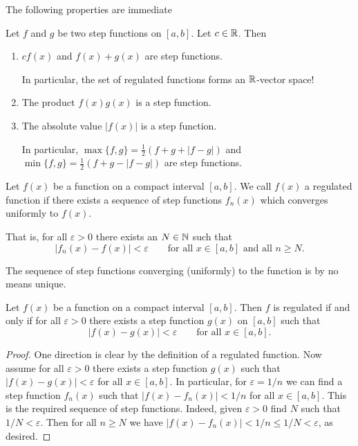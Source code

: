 \documentclass[10pt, a4paper]{article}
\begin{document}
The following properties are immediate
\begin{proposition}
    Let $f$ and $g$ be two step functions on $[a, b]$.
    Let $c \in \mathbb{R}$.
    Then
    \begin{enumerate}[label = (\roman*)]
        \item $cf(x)$ and $f(x) + g(x)$ are step functions.
        
        In particular,
        the set of regulated functions forms an $\mathbb{R}$-vector space!

        \item The product $f(x)g(x)$ is a step function.

        \item The absolute value $|f(x)|$ is a step function.

        In particular,
        $\max\{f, g\} = \frac{1}{2}(f + g + |f - g|)$ and $\min\{f, g\} = \frac{1}{2}(f + g - |f - g|)$ are step functions.
    \end{enumerate}
\end{proposition}

\begin{definition}
    Let $f(x)$ be a function on a compact interval $[a, b]$.
    We call $f(x)$ a regulated function if there exists a sequence of step functions $f_n(x)$ which converges uniformly to $f(x)$.

    That is,
    for all $\varepsilon > 0$ there exists an $N \in \mathbb{N}$ such that
    \[
    |f_n(x) - f(x)| < \varepsilon\qquad\text{for all } x \in [a, b]\text{ and all } n \geq N.
    \]
\end{definition}

\begin{remark}
    The sequence of step functions converging
    (uniformly)
    to the function is by no means unique.
\end{remark}

\begin{lemma}\label{pre:analy:lem:seqfreecritforbereg}
    Let $f(x)$ be a function on a compact interval $[a, b]$.
    Then $f$ is regulated if and only if for all $\varepsilon > 0$ there exists a step function $g(x)$ on $[a, b]$ such that
    \[
    |f(x) - g(x)| < \varepsilon\qquad\text{for all } x \in [a, b].
    \]
    \begin{proof}
        One direction is clear by the definition of a regulated function.
        Now assume for all $\varepsilon > 0$ there exists a step function $g(x)$ such that $|f(x) - g(x)| < \varepsilon$ for all $x \in [a, b]$.
        In particular,
        for $\varepsilon = 1 / n$ we can find a step function $f_n(x)$ such that $|f(x) - f_n(x)| < 1 / n$ for all $x \in [a, b]$.
        This is the required sequence of step functions.
        Indeed,
        given $\varepsilon > 0$ find $N$ such that $1 / N < \varepsilon$.
        Then for all $n \geq N$ we have $|f(x) - f_n(x)| < 1 / n \leq 1 / N < \varepsilon$,
        as desired.
    \end{proof}
\end{lemma}
\end{document}
